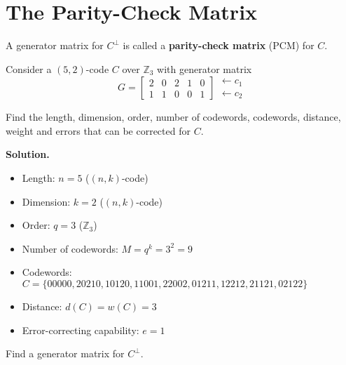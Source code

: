 \section{The Parity-Check Matrix}

\begin{defbox}
    \begin{definition}
        A generator matrix for $ C^{\perp} $ is called a \textbf{parity-check matrix}
        (PCM) for $ C $.
    \end{definition} \end{defbox}

\begin{exbox}
    \begin{example}
    Consider a $ (5,2) $-code $ C $ over $ \mathbb{Z}_3 $ with generator matrix
    \[ G=
        \begin{bmatrix}
            2 & 0 & 2 & 1 & 0 \\
            1 & 1 & 0 & 0 & 1
        \end{bmatrix}
        \begin{matrix}
            \leftarrow c_1 \\
            \leftarrow c_2
        \end{matrix} \]

    Find the length, dimension, order, number of codewords, codewords,
    distance, weight and errors that can be corrected for $ C $.

    \textbf{Solution.}
    \begin{itemize}
        \item Length: $ n=5 $ ($ (n,k) $-code)
        \item Dimension: $ k=2 $ ($ (n,k) $-code)
        \item Order: $ q=3 $ ($ \mathbb{Z}_3 $)
        \item Number of codewords: $ M=q^k=3^2=9 $
        \item Codewords: $ C=\{00000,20210,10120,11001,22002,01211,12212,21121,02122\} $
        \item Distance: $ d(C)=w(C)=3 $
        \item Error-correcting capability: $ e=1 $
    \end{itemize}

    Find a generator matrix for $ C^{\perp} $.


\end{example}
\end{exbox}
